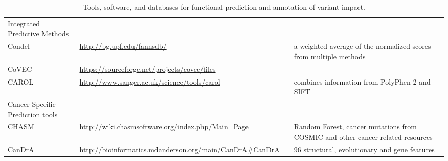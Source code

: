 \documentclass{article}
\begin{document}
\begin{table}[p]
\begin{tabularx}{1.1\textwidth}{p{2.5cm}Xp{3.5cm}p{3.5cm}}
  Integrated Predictive Methods &  &  &   \\
  Condel & \url{http://bg.upf.edu/fannsdb/} & \parencite{Gonzalez-Perez2011-gc} & a weighted average of the normalized scores from multiple methods \\
  CoVEC & \url{https://sourceforge.net/projects/covec/files} &   &   \\
  CAROL & \url{http://www.sanger.ac.uk/science/tools/carol} & \parencite{Lopes2012-je} & combines information from PolyPhen-2 and SIFT \\
  Cancer Specific Prediction tools &  &  &   \\
  CHASM & \url{http://wiki.chasmsoftware.org/index.php/Main_Page} & \parencite{Carter2009-ci} & Random Forest, cancer mutations from COSMIC and other cancer-related resources \\
  CanDrA & \url{http://bioinformatics.mdanderson.org/main/CanDrA\#CanDrA} & \parencite{Mao2013-ie} & 96  structural, evolutionary and gene features  \\
   \hline
\end{tabularx}
\caption{Tools, software, and databases for functional prediction and annotation of variant impact. }
\label{table:2}
\end{table}
\end{document}
